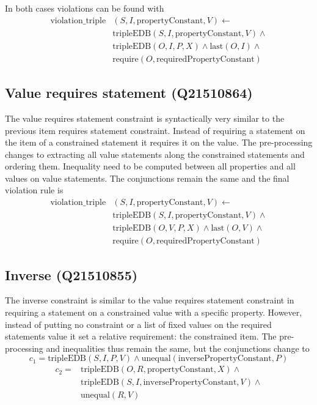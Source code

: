 \documentclass[hyperref,bachelorofscience,fleqn]{cgvpub}
\begin{document}
In both cases violations can be found with
\begin{equation*}
\begin{split}
\text{violation\_triple}&(S, I, \text{propertyConstant}, V) \leftarrow \\
&\text{tripleEDB}(S, I, \text{propertyConstant}, V) \wedge \\
&\text{tripleEDB}(O, I, P, X) \wedge \text{last}(O, I) \wedge \\
&\text{require}(O, \text{requiredPropertyConstant})
\end{split}
\end{equation*}

\subsection{Value requires statement (Q21510864)}
The value requires statement constraint is syntactically very similar to the previous item requires statement constraint. Instead of requiring a statement on the item of a constrained statement it requires it on the value. The pre-processing changes to extracting all value statements along the constrained statements and ordering them. Inequality need to be computed between all properties and all values on value statements. The conjunctions remain the same and the final violation rule is
\begin{equation*}
\begin{split}
\text{violation\_triple}&(S, I, \text{propertyConstant}, V) \leftarrow \\
&\text{tripleEDB}(S, I, \text{propertyConstant}, V) \wedge \\
&\text{tripleEDB}(O, V, P, X) \wedge \text{last}(O, V) \wedge \\
&\text{require}(O, \text{requiredPropertyConstant})
\end{split}
\end{equation*}

\subsection{Inverse (Q21510855)}
The inverse constraint is similar to the value requires statement constraint in requiring a statement on a constrained value with a specific property. However, instead of putting no constraint or a list of fixed values on the required statements value it set a relative requirement: the constrained item. The pre-processing and inequalities thus remain the same, but the conjunctions change to 
\begin{equation*}
c_1 = \text{tripleEDB}(S, I, P, V) \wedge \text{unequal}(\text{inversePropertyConstant}, P)
\end{equation*}
\begin{equation*}
\begin{split}
c_2 = &\text{tripleEDB}(O, R, \text{propertyConstant}, X) \wedge \\
&\text{tripleEDB}(S, I, \text{inversePropertyConstant}, V) \wedge \\
&\text{unequal}(R, V)
\end{split}
\end{equation*}
\end{document}
